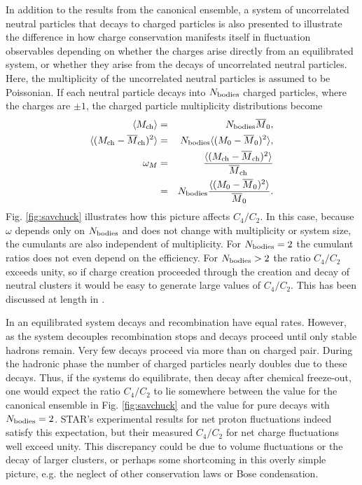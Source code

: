 \documentclass[aps,prc,nofootinbib,showpacs,superscriptaddress,groupedaddress]{revtex4-1}
\begin{document}
In addition to the results from the canonical ensemble, a system of uncorrelated neutral particles that decays to charged particles is also presented to illustrate the difference in how charge conservation manifests itself in fluctuation observables depending on whether the charges arise directly from an equilibrated system, or whether they arise from the decays of uncorrelated neutral particles. Here, the multiplicity of the uncorrelated neutral particles is assumed to be Poissonian. If each neutral particle decays into $N_{\rm bodies}$ charged particles, where the charges are $\pm 1$, the charged particle multiplicity distributions become 
\begin{eqnarray}
\langle M_{\rm ch}\rangle&=&N_{\rm bodies}\overline{M}_0,\\
\nonumber
\langle(M_{\rm ch}-\overline{M}_{\rm ch})^2\rangle&=&N_{\rm bodies}\langle(M_0-\overline{M}_0)^2\rangle,\\
\nonumber
\omega_M&=&\frac{\langle(M_{\rm ch}-\overline{M}_{\rm ch})^2\rangle}{\overline{M}_{\rm ch}}\\
\nonumber
&=&N_{\rm bodies}\frac{\langle(M_0-\overline{M}_0)^2\rangle}{\overline{M}_0}.
\end{eqnarray}
Fig. \ref{fig:savchuck} illustrates how this picture affects $C_4/C_2$. In this case, because $\omega$ depends only on $N_{\rm bodies}$ and does not change with multiplicity or system size, the cumulants are also independent of multiplicity. For $N_{\rm bodies}=2$ the cumulant ratios does not even depend on the efficiency. For $N_{\rm bodies}>2$ the ratio $C_4/C_2$ exceeds unity, so if charge creation proceeded through the creation and decay of neutral clusters it would be easy to generate large values of $C_4/C_2$. This has been discussed at length in \cite{Bzdak:2018uhv}.

In an equilibrated system decays and recombination have equal rates. However, as the system decouples recombination stops and decays proceed until only stable hadrons remain. Very few decays proceed via more than on charged pair. During the hadronic phase the number of charged particles nearly doubles due to these decays. Thus, if the systems do equilibrate, then decay after chemical freeze-out, one would expect the ratio $C_4/C_2$ to lie somewhere between the value for the canonical ensemble in Fig. \ref{fig:savchuck} and the value for pure decays with $N_{\rm bodies}=2$. STAR's experimental results for net proton fluctuations indeed satisfy this expectation, but their measured $C_4/C_2$ for net charge fluctuations well exceed unity. This discrepancy could be due to volume fluctuations or the decay of larger clusters, or perhaps some shortcoming in this overly simple picture, e.g. the neglect of other conservation laws or Bose condensation. 
\end{document}
